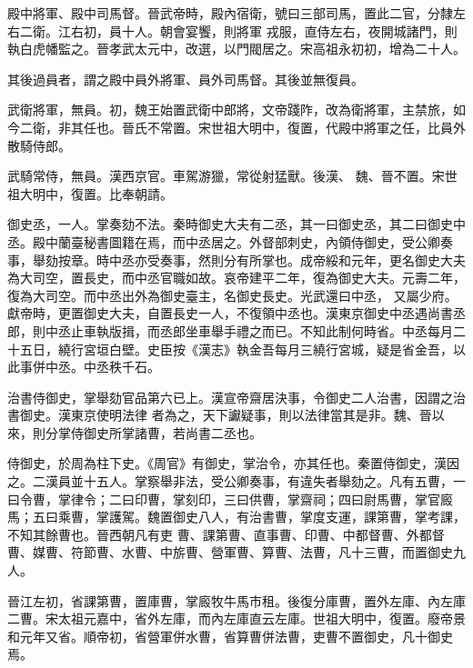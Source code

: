 \begin{pinyinscope}
 殿中將軍、殿中司馬督。晉武帝時，殿內宿衛，號曰三部司馬，置此二官，分隸左右二衛。江右初，員十人。朝會宴饗，則將軍
 戎服，直侍左右，夜開城諸門，則執白虎幡監之。晉孝武太元中，改選，以門閥居之。宋高祖永初初，增為二十人。



 其後過員者，謂之殿中員外將軍、員外司馬督。其後並無復員。



 武衛將軍，無員。初，魏王始置武衛中郎將，文帝踐阼，改為衛將軍，主禁旅，如今二衛，非其任也。晉氏不常置。宋世祖大明中，復置，代殿中將軍之任，比員外散騎侍郎。



 武騎常侍，無員。漢西京官。車駕游獵，常從射猛獸。後漢、
 魏、晉不置。宋世祖大明中，復置。比奉朝請。



 御史丞，一人。掌奏劾不法。秦時御史大夫有二丞，其一曰御史丞，其二曰御史中丞。殿中蘭臺秘書圖籍在焉，而中丞居之。外督部刺史，內領侍御史，受公卿奏事，舉劾按章。時中丞亦受奏事，然則分有所掌也。成帝綏和元年，更名御史大夫為大司空，置長史，而中丞官職如故。哀帝建平二年，復為御史大夫。元壽二年，復為大司空。而中丞出外為御史臺主，名御史長史。光武還曰中丞，
 又屬少府。獻帝時，更置御史大夫，自置長史一人，不復領中丞也。漢東京御史中丞遇尚書丞郎，則中丞止車執版揖，而丞郎坐車舉手禮之而已。不知此制何時省。中丞每月二十五日，繞行宮垣白壁。史臣按《漢志》執金吾每月三繞行宮城，疑是省金吾，以此事併中丞。中丞秩千石。



 治書侍御史，掌舉劾官品第六已上。漢宣帝齋居決事，令御史二人治書，因謂之治書御史。漢東京使明法律
 者為之，天下讞疑事，則以法律當其是非。魏、晉以來，則分掌侍御史所掌諸曹，若尚書二丞也。



 侍御史，於周為柱下史。《周官》有御史，掌治令，亦其任也。秦置侍御史，漢因之。二漢員並十五人。掌察舉非法，受公卿奏事，有違失者舉劾之。凡有五曹，一曰令曹，掌律令；二曰印曹，掌刻印，三曰供曹，掌齋祠；四曰尉馬曹，掌官廄馬；五曰乘曹，掌護駕。魏置御史八人，有治書曹，掌度支運，課第曹，掌考課，不知其餘曹也。晉西朝凡有吏
 曹、課第曹、直事曹、印曹、中都督曹、外都督曹、媒曹、符節曹、水曹、中旂曹、營軍曹、算曹、法曹，凡十三曹，而置御史九人。



 晉江左初，省課第曹，置庫曹，掌廄牧牛馬市租。後復分庫曹，置外左庫、內左庫二曹。宋太祖元嘉中，省外左庫，而內左庫直云左庫。世祖大明中，復置。廢帝景和元年又省。順帝初，省營軍併水曹，省算曹併法曹，吏曹不置御史，凡十御史焉。




\end{pinyinscope}

